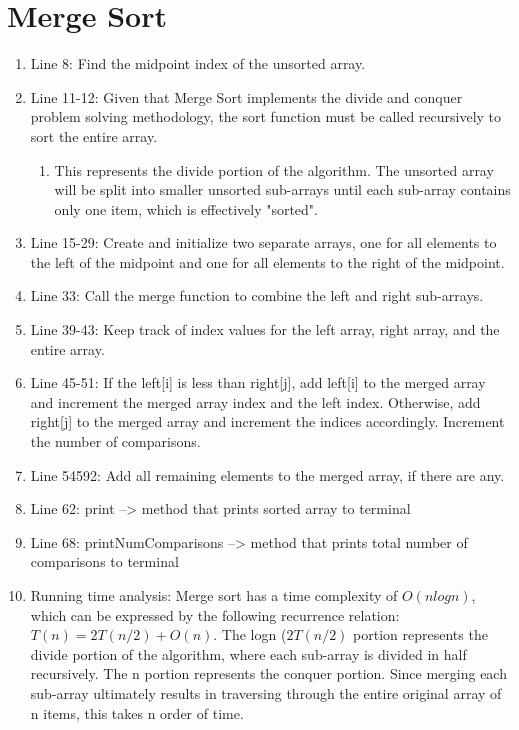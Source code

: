 \documentclass[letterpaper, 10pt,DIV=13]{scrartcl}
\numberwithin{equation}{section} %
\numberwithin{figure}{section} %
\numberwithin{table}{section} %
\begin{document}
\section{Merge Sort}
\begin{enumerate}
    \item Line 8: Find the midpoint index of the unsorted array.
    \item Line 11-12: Given that Merge Sort implements the divide and conquer problem solving methodology, the sort function must be called recursively to sort the entire array.
    \begin{enumerate}
        \item This represents the divide portion of the algorithm. The unsorted array will be split into smaller unsorted sub-arrays until each sub-array contains only one item, which is effectively "sorted". 
    \end{enumerate}
    \item Line 15-29: Create and initialize two separate arrays, one for all elements to the left of the midpoint and one for all elements to the right of the midpoint.
    \item Line 33: Call the merge function to combine the left and right sub-arrays.
    \item Line 39-43: Keep track of index values for the left array, right array, and the entire array.
    \item Line 45-51: If the left[i] is less than right[j], add left[i] to the merged array and increment the merged array index and the left index. Otherwise, add right[j] to the merged array and increment the indices accordingly. Increment the number of comparisons.
    \item Line 54592: Add all remaining elements to the merged array, if there are any.
    \item Line 62: print --> method that prints sorted array to terminal
    \item Line 68: printNumComparisons --> method that prints total number of comparisons to terminal
    \item Running time analysis: Merge sort has a time complexity of $O(nlogn)$, which can be expressed by the following recurrence relation: $T(n) = 2T(n/2) + O(n)$. The logn ($2T(n/2)$ portion represents the divide portion of the algorithm, where each sub-array is divided in half recursively. The n portion represents the conquer portion. Since merging each sub-array ultimately results in traversing through the entire original array of n items, this takes n order of time.
\end{enumerate}
\end{document}
